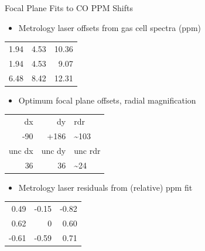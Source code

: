 \documentclass[10pt]{beamer}
\begin{document}
\begin{frame}[label={sec:org7fd0465}]{Focal Plane Fits to CO PPM Shifts}
\begin{small}

\begin{itemize}
\item Metrology laser offsets from gas cell spectra (ppm)
\end{itemize}
\begin{center}
\begin{tabular}{rrr}
1.94 & 4.53 & 10.36\\
1.94 & 4.53 & 9.07\\
6.48 & 8.42 & 12.31\\
\end{tabular}
\end{center}

\begin{itemize}
\item Optimum focal plane offsets, radial magnification
\end{itemize}
\begin{center}
\begin{tabular}{rrl}
dx & dy & rdr\\
-90 & +186 & \textasciitilde{}103\\
\hline
unc   dx & unc   dy & unc rdr\\
36 & 36 & \textasciitilde{}24\\
\end{tabular}
\end{center}

\begin{itemize}
\item Metrology laser residuals from (relative) ppm fit
\end{itemize}
\begin{center}
\begin{tabular}{rrr}
0.49 & -0.15 & -0.82\\
0.62 & 0 & 0.60\\
-0.61 & -0.59 & 0.71\\
\end{tabular}
\end{center}
\end{small}
\end{frame}
\end{document}
